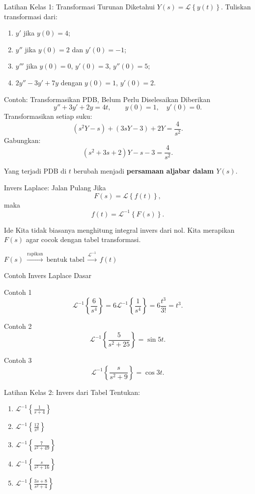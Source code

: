 \documentclass[aspectratio=169,10pt]{beamer}
\newcommand{\Lcal}{\mathcal{L}}
\newcommand{\Lap}[1]{\Lcal\left\{#1\right\}}
\newcommand{\invLap}[1]{\Lcal^{-1}\left\{#1\right\}}
\begin{document}
\begin{frame}{Latihan Kelas 1: Transformasi Turunan}
Diketahui $Y(s)=\Lap{y(t)}$. Tuliskan transformasi dari:
\begin{enumerate}
\item $y'$ jika $y(0)=4$;
\item $y''$ jika $y(0)=2$ dan $y'(0)=-1$;
\item $y'''$ jika $y(0)=0$, $y'(0)=3$, $y''(0)=5$;
\item $2y''-3y'+7y$ dengan $y(0)=1$, $y'(0)=2$.
\end{enumerate}
\end{frame}

\begin{frame}{Contoh: Transformasikan PDB, Belum Perlu Diselesaikan}
Diberikan
\[
y''+3y'+2y=4t,\qquad y(0)=1,\quad y'(0)=0.
\]
Transformasikan setiap suku:
\[
(s^2Y-s)+(3sY-3)+2Y=\frac{4}{s^2}.
\]
Gabungkan:
\[
(s^2+3s+2)Y-s-3=\frac{4}{s^2}.
\]
\begin{exampleblock}{Yang terjadi}
PDB di $t$ berubah menjadi \textbf{persamaan aljabar dalam $Y(s)$}.
\end{exampleblock}
\end{frame}

\begin{frame}{Invers Laplace: Jalan Pulang}
Jika
\[
F(s)=\Lap{f(t)},
\]
maka
\[
f(t)=\invLap{F(s)}.
\]
\begin{block}{Ide}
Kita tidak biasanya menghitung integral invers dari nol. Kita merapikan $F(s)$ agar cocok dengan tabel transformasi.
\end{block}
\centering
\Large
$F(s)\ \xrightarrow{\text{rapikan}}\ \text{bentuk tabel}\ \xrightarrow{\Lcal^{-1}}\ f(t)$
\end{frame}

\begin{frame}{Contoh Invers Laplace Dasar}
\begin{exampleblock}{Contoh 1}
\[
\invLap{\frac{6}{s^4}}
=6\invLap{\frac{1}{s^4}}
=6\frac{t^3}{3!}=t^3.
\]
\end{exampleblock}
\begin{exampleblock}{Contoh 2}
\[
\invLap{\frac{5}{s^2+25}}=\sin 5t.
\]
\end{exampleblock}
\begin{exampleblock}{Contoh 3}
\[
\invLap{\frac{s}{s^2+9}}=\cos 3t.
\]
\end{exampleblock}
\end{frame}

\begin{frame}{Latihan Kelas 2: Invers dari Tabel}
Tentukan:
\begin{enumerate}
\item $\displaystyle \invLap{\frac{1}{s+4}}$
\item $\displaystyle \invLap{\frac{12}{s^3}}$
\item $\displaystyle \invLap{\frac{7}{s^2+49}}$
\item $\displaystyle \invLap{\frac{s}{s^2+16}}$
\item $\displaystyle \invLap{\frac{3s+8}{s^2+4}}$
\end{enumerate}
\end{frame}
\end{document}
